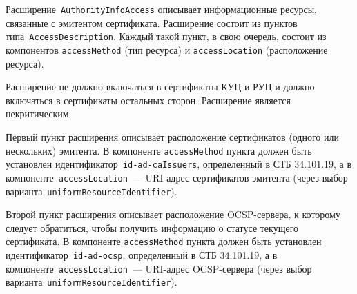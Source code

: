 Расширение~\texttt{AuthorityInfoAccess} описывает информационные ресурсы, 
связанные с эмитентом сертификата.
%
Расширение состоит из пунктов типа~\texttt{AccessDescription}. 
Каждый такой пункт, в свою очередь, состоит из компонентов 
\texttt{accessMethod} (тип ресурса) и \texttt{accessLocation} 
(расположение ресурса). 

Расширение не должно включаться в сертификаты КУЦ и РУЦ и должно 
включаться в сертификаты остальных сторон. Расширение является 
некритическим. 

Первый пункт расширения описывает расположение сертификатов (одного или нескольких) 
эмитента. В компоненте \texttt{accessMethod} пункта должен быть установлен 
идентификатор~\verb|id-ad-caIssuers|, определенный в СТБ 34.101.19, 
%
а в компоненте~\texttt{accessLocation}~--- URI-адрес сертификатов эмитента
(через выбор варианта~\texttt{uniformResourceIdentifier}).

Второй пункт расширения описывает расположение OCSP-сервера, к которому следует 
обратиться, чтобы получить информацию о статусе текущего сертификата.
В компоненте \texttt{accessMethod} пункта должен быть установлен 
идентификатор~\verb|id-ad-ocsp|, определенный в СТБ 34.101.19,
%
а в компоненте~\texttt{accessLocation}~--- URI-адрес OCSP-сервера
(через выбор варианта~\texttt{uniformResourceIdentifier}).
